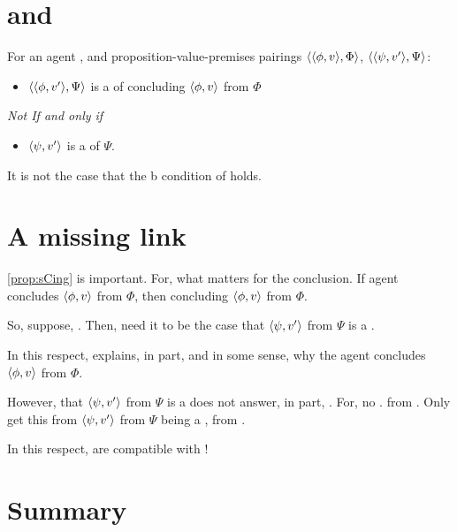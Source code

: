 \section{ and }

\begin{note}
  \begin{proposition}
    For an agent \vAgent{}, and proposition-value-premises pairings \(\langle \langle \phi, v \rangle, \Phi \rangle\), \(\langle \langle \psi, v' \rangle, \Psi \rangle\):

    \begin{itemize}
    \item
      \(\langle \langle \phi, v' \rangle, \Psi \rangle\) is a \emph{\curb{}} of concluding \(\langle \phi, v \rangle\) from \(\Phi\)
    \end{itemize}

    \emph{Not If and only if}

    \begin{itemize}
    \item
      \(\langle \psi, v' \rangle\) is a \fc{} of \(\Psi\).
    \end{itemize}
    \begin{argument}
      It is not the case that the b condition of \fc{} holds.
    \end{argument}
  \end{proposition}
\end{note}



\section{A missing link}
\label{cha:zS:sec:missing-link}

\begin{note}
  \autoref{prop:sCing} is important.
  For, what matters for the conclusion.
  If agent concludes \(\langle \phi, v \rangle\) from \(\Phi\), then concluding \(\langle \phi, v \rangle\) from \(\Phi\).

  So, suppose, \curb{}.
  Then, need it to be the case that \(\langle \psi, v' \rangle\) from \(\Psi\) is a \fc{}.

  In this respect, \fc{} explains, in part, and in some sense, why the agent concludes \(\langle \phi, v \rangle\) from \(\Phi\).

  However, that \(\langle \psi, v' \rangle\) from \(\Psi\) is a \fc{} does not answer, in part, \qWhyV{}.
  For, no \ros{}.
  \ros{} from \agpe{}.
  Only get this from \(\langle \psi, v' \rangle\) from \(\Psi\) being a \fc{}, from \agpe{}.

  In this respect,  are compatible with \issueConstraint{}!
\end{note}

\section{Summary}
\label{cha:zS:sec:curbs:summary}


